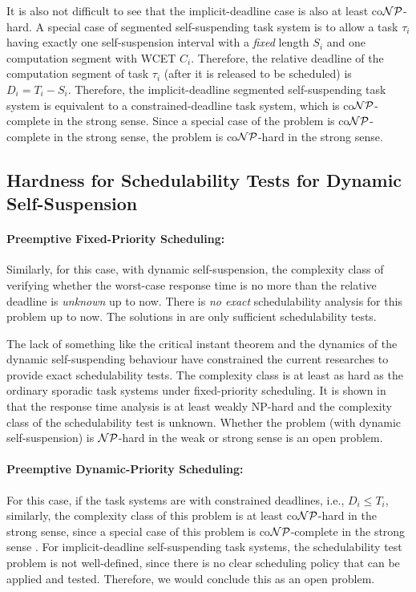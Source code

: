 It is also not difficult to see that the implicit-deadline case is also at least co${\cal NP}$-hard.  A special case of segmented self-suspending task system is to allow a task $\tau_i$ having exactly one self-suspension interval with a \emph{fixed} length $S_i$ and one computation segment with WCET $C_i$. Therefore, the relative deadline of the computation segment of task $\tau_i$ (after it is released to be scheduled) is $D_i = T_i-S_i$. Therefore, the implicit-deadline segmented self-suspending task system is equivalent to a constrained-deadline task system, which is co${\cal NP}$-complete in the strong sense. Since a special case of the problem is co${\cal NP}$-complete in the strong sense, the problem is co${\cal NP}$-hard in the strong sense.


\subsection{Hardness for Schedulability Tests for Dynamic Self-Suspension}
\paragraph{Preemptive Fixed-Priority Scheduling:}   

Similarly, for this case, with dynamic self-suspension, the complexity class of verifying whether the worst-case response time is no more than the relative deadline is \emph{unknown} up to now. There is \emph{no exact} schedulability analysis for this problem up to now. The solutions in \cite{Liu:2000:RS:518501}\cite{LiuChen:rtss2014}\cite{huangpass:dac2015} are only sufficient schedulability tests. 

The lack of something like the critical instant theorem and the dynamics of the dynamic self-suspending behaviour have constrained the current researches to provide exact schedulability tests. The complexity class is at least as hard as the ordinary sporadic task systems under fixed-priority scheduling. It is shown in \cite{EisenbrandR08} that the response time analysis is at least weakly NP-hard and the complexity class of the schedulability test is unknown. Whether the problem (with dynamic self-suspension) is ${\cal NP}$-hard in the weak or strong sense is an open problem.

\paragraph{Preemptive Dynamic-Priority Scheduling:} 
For this case, if the task systems are with constrained deadlines, i.e., $D_i \leq T_i$, similarly, the complexity class of this problem is at least co${\cal NP}$-hard in the strong sense, since a special case of this problem is co${\cal NP}$-complete in the strong sense \cite{DBLP:conf/ecrts/Ekberg015}. For implicit-deadline self-suspending task systems, the schedulability test problem is not well-defined, since there is no clear scheduling policy that can be applied and tested. Therefore, we would conclude this as an open problem.


